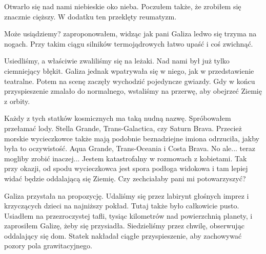 Otwarło się nad nami niebieskie oko nieba.
Poczułem także, że zrobiłem się znacznie cięższy.
W dodatku ten przeklęty reumatyzm.

\begin{dialogue}
	\ds{} Może usiądziemy? \dm{} zaproponowałem, widząc jak pani Galiza ledwo się trzyma na nogach. \dm{} Przy takim ciągu silników termojądrowych łatwo upaść i coś zwichnąć.
\end{dialogue}

Usiedliśmy, a właściwie zwaliliśmy się na leżaki.
Nad nami był już tylko ciemniejący błękit.
Galiza jednak wpatrywała się w niego, jak w przedstawienie teatralne.
Potem na scenę zaczęły wychodzić pojedyncze gwiazdy.
Gdy w końcu przyspieszenie zmalało do normalnego, wstaliśmy na przerwę, aby obejrzeć Ziemię z orbity.

\begin{dialogue}
	\ds{} Każdy z tych statków kosmicznych ma taką nudną nazwę. \dm{} Spróbowałem przełamać lody. \dm{} Stella Grande, Trans-Galactica, czy Saturn Brava. 
	\ds{} Przecież morskie wycieczkowce także mają podobnie beznadziejne imiona \dm{} odrzuciła, jakby była to oczywistość. \dm{} Aqua Grande, Trans-Oceania i Costa Brava.
	\ds{} No ale... teraz mogliby zrobić inaczej... \dm{} Jestem katastrofalny w rozmowach z kobietami. \dm{} 
			Tak przy okazji, od spodu wycieczkowca jest spora podłoga widokowa i tam lepiej widać będzie oddalającą się Ziemię. Czy zechciałaby pani mi potowarzyszyć?
\end{dialogue}

Galiza przystała na propozycję.
Udaliśmy się przez labirynt głośnych imprez i krzyczących dzieci na najniższy pokład.
Tutaj także było całkowicie pusto.
Usiadłem na przezroczystej tafli, tysiąc kilometrów nad powierzchnią planety, i zaprosiłem Galizę, żeby się przysiadła.
Siedzieliśmy przez chwilę, obserwując oddalający się dom. Statek nakładał ciągłe przyspieszenie, aby zachowywać pozory pola grawitacyjnego.

